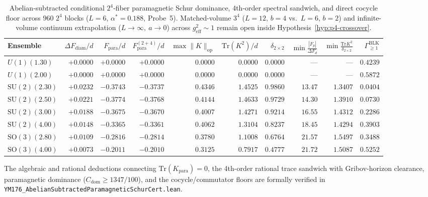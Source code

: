 \documentclass[11pt,a4paper]{article}
\newcommand{\SU}{\mathrm{SU}}
\newcommand{\tr}{\mathrm{Tr}}
\begin{document}
\begin{table}[ht]
\centering
\scriptsize
\begin{tabular}{@{}lrrrrrrrrr@{}}
\toprule
Ensemble & $\Delta F_{\mathrm{diam}}/d$ & $F_{\mathrm{para}}/d$ & $F_{\mathrm{para}}^{(2+4)}/d$ & $\max\|K\|_{\mathrm{op}}$ & $\mathrm{Tr}(K^2)/d$ & $\delta_{2\times 2}$ & $\min\frac{|F_p|}{\Delta F_d}$ & $\min\frac{\mathrm{Tr}K^2}{\delta_{2\times 2}}$ & $\Gamma_{\ge 1}^{\mathrm{BLK}}$ \\
\midrule
$U(1)(1.30)$ & $+0.0000$ & $+0.0000$ & $+0.0000$ & $0.0000$ & $0.0000$ & $0.0000$ & --- & --- & $0.4239$ \\
$U(1)(2.00)$ & $+0.0000$ & $+0.0000$ & $+0.0000$ & $0.0000$ & $0.0000$ & $0.0000$ & --- & --- & $0.5872$ \\
$\SU(2)(2.30)$ & $+0.0232$ & $-0.3743$ & $-0.3737$ & $0.4346$ & $1.4525$ & $0.9860$ & $13.47$ & $1.3407$ & $0.0404$ \\
$\SU(2)(2.50)$ & $+0.0221$ & $-0.3774$ & $-0.3768$ & $0.4144$ & $1.4633$ & $0.9729$ & $14.30$ & $1.3910$ & $0.0730$ \\
$\SU(2)(3.00)$ & $+0.0188$ & $-0.3675$ & $-0.3670$ & $0.4007$ & $1.4271$ & $0.9214$ & $16.55$ & $1.4312$ & $0.2286$ \\
$\SU(2)(4.00)$ & $+0.0148$ & $-0.3365$ & $-0.3361$ & $0.4062$ & $1.3104$ & $0.8237$ & $18.45$ & $1.4294$ & $0.3903$ \\
$\mathrm{SO}(3)(2.80)$ & $+0.0109$ & $-0.2816$ & $-0.2814$ & $0.3780$ & $1.1008$ & $0.6764$ & $21.57$ & $1.5497$ & $0.3488$ \\
$\mathrm{SO}(3)(4.00)$ & $+0.0073$ & $-0.2011$ & $-0.2010$ & $0.3125$ & $0.7917$ & $0.4777$ & $21.72$ & $1.5087$ & $0.5252$ \\
\bottomrule
\end{tabular}
\caption{Abelian-subtracted conditional $2^4$-fiber paramagnetic Schur dominance, 4th-order spectral sandwich, and direct cocycle floor across $960$ $2^4$ blocks ($L=6$, $\alpha^* = 0.188$, Probe~5). Matched-volume $3^4$ ($L=12,\,b=4$ vs.\ $L=6,\,b=2$) and infinite-volume continuum extrapolation ($L \to \infty,\ a \to 0$) across $g_{\mathrm{eff}}^2 \sim 1$ remain open inside Hypothesis~\ref{hyp:p4-crossover}.}
\label{tab:probe5-sandwich}
\end{table}

The algebraic and rational deductions connecting $\tr(K_{\mathrm{para}}) = 0$, the 4th-order rational trace sandwich with Gribov-horizon clearance, paramagnetic dominance ($C_{\mathrm{dom}} \ge 1347/100$), and the cocycle/commutator floors are formally verified in \texttt{YM176\_AbelianSubtractedParamagneticSchurCert.lean}.
\end{document}
